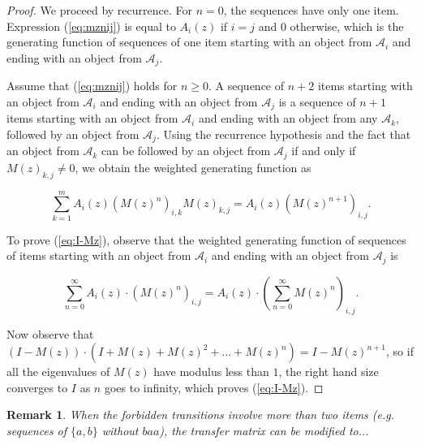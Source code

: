 \documentclass{article}
\newtheorem{remark}{Remark}
\begin{document}
\begin{proof}
We proceed by recurrence. For $n = 0$, the sequences have only one item.
Expression (\ref{eq:mznij}) is equal to $A_i(z)$ if $i = j$ and $0$
otherwise, which is the generating function of sequences of one item
starting with an object from $\mathcal{A}_i$ and ending with an object
from $\mathcal{A}_j$.

Assume that (\ref{eq:mznij}) holds for $n \geq 0$. A sequence of $n+2$
items starting with an object from $\mathcal{A}_i$ and ending with an
object from $\mathcal{A}_j$ is a sequence of $n+1$ items starting with an
object from $\mathcal{A}_i$ and ending with an object from any
$\mathcal{A}_k$, followed by an object from $\mathcal{A}_j$. Using the
recurrence hypothesis and the fact that an object from $\mathcal{A}_k$ can
be followed by an object from $\mathcal{A}_j$ if and only if $M(z)_{k,j}
\neq 0$, we obtain the weighted generating function as

\begin{equation*}
\sum_{k = 1}^m A_i(z)\left( M(z)^n \right)_{i,k} M(z)_{k,j} 
 = A_i(z) \left( M(z)^{n+1} \right)_{i,j}.
\end{equation*}

To prove (\ref{eq:I-Mz}), observe that the weighted generating function of
sequences of items starting with an object from $\mathcal{A}_i$ and ending
with an object from $\mathcal{A}_j$ is

\begin{equation*}
\sum_{n=0}^\infty A_i(z) \cdot \left(M(z)^n \right)_{i,j} =
 A_i(z) \cdot \left( \sum_{n=0}^\infty M(z)^n\right)_{i,j} .
\end{equation*}

Now observe that $(I-M(z)) \cdot (I+M(z)+M(z)^2+ \ldots + M(z)^n) =
I-M(z)^{n+1}$, so if all the eigenvalues of $M(z)$ have modulus less than
$1$, the right hand size converges to $I$ as $n$ goes to infinity, which
proves (\ref{eq:I-Mz}).
\end{proof}

\begin{remark}
When the forbidden transitions involve more than two items (\textit{e.g.}
sequences of $\{a,b\}$ without $baa$), the transfer matrix can be modified
to...
\end{remark}
\end{document}
